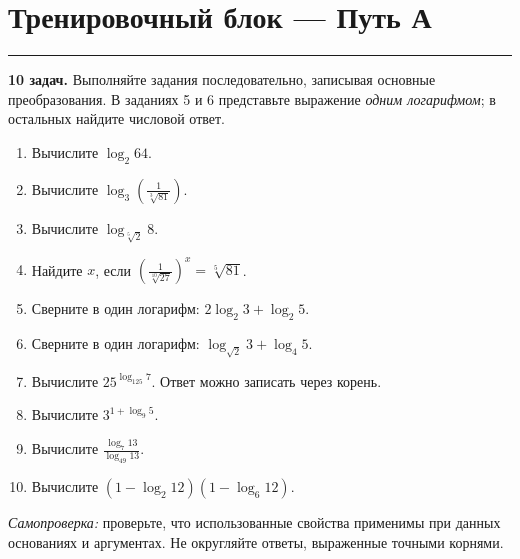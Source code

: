 \documentclass[a4paper,12pt]{article}
\newcommand{\sectionline}{\par\vspace{1pt}\noindent\color{accent}\rule{\linewidth}{0.6pt}\par\color{textgray}\vspace{3pt}}
\begin{document}
\section*{Тренировочный блок — Путь А}
\sectionline
\textbf{10 задач.} Выполняйте задания последовательно, записывая основные преобразования. В заданиях 5 и 6 представьте выражение \emph{одним логарифмом}; в остальных найдите числовой ответ.
\begin{enumerate}[label=\textbf{\arabic*.}]
\item Вычислите $\log_2 64$.
\item Вычислите $\displaystyle\log_3\!\left(\frac1{\sqrt[3]{81}}\right)$.
\item Вычислите $\displaystyle\log_{\sqrt[5]{2}}8$.
\item Найдите $x$, если $\displaystyle\left(\frac1{\sqrt[10]{27}}\right)^x=\sqrt[5]{81}$.
\item Сверните в один логарифм: $2\log_2 3+\log_2 5$.
\item Сверните в один логарифм: $\displaystyle\log_{\sqrt2}3+\log_4 5$.
\item Вычислите $\displaystyle25^{\log_{125}7}$. Ответ можно записать через корень.
\item Вычислите $\displaystyle3^{1+\log_9 5}$.
\item Вычислите $\displaystyle\frac{\log_7 13}{\log_{49}13}$.
\item Вычислите $\displaystyle(1-\log_2 12)(1-\log_6 12)$.
\end{enumerate}
\vfill
\textit{Самопроверка:} проверьте, что использованные свойства применимы при данных основаниях и аргументах. Не округляйте ответы, выраженные точными корнями.

\clearpage
\end{document}
